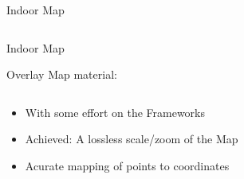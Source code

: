 \documentclass[11pt]{beamer}
\begin{document}
\begin{frame}{Indoor Map}
\begin{columns}[T]
\begin{column}{.4\textwidth}
  \end{column}
\end{columns}

\end{frame}


\begin{frame}{Indoor Map}

Overlay Map material:

  \begin{columns}[T]
  \begin{column}{.6\textwidth}
  \begin{itemize}
    \item With some effort on the Frameworks
    \item Achieved: A lossless scale/zoom of the Map
    \item Acurate mapping of points to coordinates
  \end{itemize}
  \end{column}
  \begin{column}{.4\textwidth}

\end{column}
\end{columns}
\end{frame}
\end{document}
